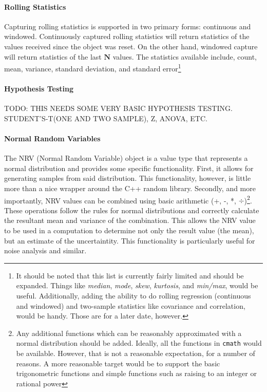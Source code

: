 \documentclass[10pt,letterpaper]{memoir} %
\begin{document}
\paragraph{Rolling Statistics}
Capturing rolling statistics is supported in two primary forms: continuous and windowed.  Continuously captured rolling statistics will return statistics of the values received since the object was reset.  On the other hand, windowed capture will return statistics of the last $\textbf{N}$ values.  The statistics available include, count, mean, variance, standard deviation, and standard error\footnote{It should be noted that this list is currently fairly limited and should be expanded.  Things like \emph{median}, \emph{mode}, \emph{skew}, \emph{kurtosis}, and \emph{min/max}, would be useful.  Additionally, adding the ability to do rolling regression (continuous and windowed) and two-sample statistics like covariance and correlation, would be handy.  Those are for a later date, however.} 

\paragraph{Hypothesis Testing}
TODO: THIS NEEDS SOME VERY BASIC HYPOTHESIS TESTING. STUDENT'S-T(ONE AND TWO SAMPLE), Z, ANOVA, ETC.
 
\paragraph{Normal Random Variables}
The NRV (Normal Random Variable) object is a value type that represents a normal distribution and provides some specific functionality.  First, it allows for generating samples from said distribution.  This functionality, however, is little more than a nice wrapper around the C++ random library.  Secondly, and more importantly, NRV values can be combined using basic arithmetic (+, -, *, $\div$)\footnote{Any additional functions which can be reasonably approximated with a normal distribution should be added.  Ideally, all the functions in \texttt{cmath} would be available.  However, that is not a reasonable expectation, for a number of reasons.  A more reasonable target would be to support the basic trigonometric functions and simple functions such as raising to an integer or rational power}.  These operations follow the rules for normal distributions and correctly calculate the resultant mean and variance of the combination.  This allows the NRV value to be used in a computation to determine not only the result value (the mean), but an estimate of the uncertaintity.  This functionality is particularly useful for noise analysis and similar. 
\end{document}
